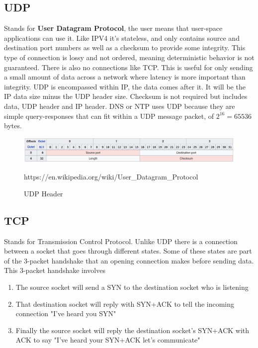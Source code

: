 \documentclass[../CMPUT-404-Notes.tex]{subfiles}
\begin{document}
\subsection{UDP}
Stands for \textbf{User Datagram Protocol}, the user means that user-space applications can use it. Like IPV4 it's stateless, and only contains source and destination port numbers as well as a checksum to provide some integrity. 
This type of connection is lossy and not ordered, meaning deterministic behavior is not guaranteed. 
There is also no connections like TCP.
This is useful for only sending a small amount of data across a network where latency is more important than integrity.
UDP is encompassed within IP, the data comes after it. It will be the IP data size minus the UDP header size.
Checksum is not required but includes data, UDP header and IP header. 
DNS or NTP uses UDP because they are simple query-responses that can fit within a UDP message packet, of \(2^{16} = 65536\) bytes.

\begin{figure}[!h]
  \centering
  \includegraphics[width=\columnwidth]{../assets/UDP-header.png}
  \caption{UDP Header}
  https://en.wikipedia.org/wiki/User\_Datagram\_Protocol
\end{figure}

\subsection{TCP}
Stands for Transmission Control Protocol. Unlike UDP there is a connection between a socket that goes through different states. 
Some of these states are part of the 3-packet handshake that an opening connection makes before sending data. 
This 3-packet handshake involves 
\begin{enumerate}
  \item The source socket will send a SYN to the destination socket who is listening
  \item That destination socket will reply with SYN+ACK to tell the incoming connection "I've heard you SYN"
  \item Finally the source socket will reply the destination socket's SYN+ACK with ACK to say "I've heard your SYN+ACK let's communicate"
\end{enumerate}
\end{document}
